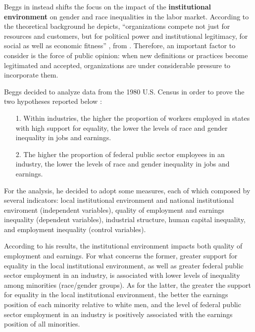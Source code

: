 Beggs in \cite{beggs1995institutional} instead shifts the focus on the impact of the \textbf{institutional environment} on gender and race inequalities in the labor market. According to the theoretical background he depicts, ``organizations compete not just for resources and customers, but for political power and institutional legitimacy, for social as well as economic fitness'' \cite[p.~613]{beggs1995institutional}, from \cite[p.~150]{dimaggio1983iron}. Therefore, an important factor to consider is the force of public opinion: when new definitions or practices become legitimated and accepted, organizations are under considerable pressure to incorporate them.

Beggs decided to analyze data from the 1980 U.S. Census in order to prove the two hypotheses reported below \cite{beggs1995institutional}:
\begin{itemize}
\item[1.] Within industries, the higher the proportion of workers employed in states with high support for equality, the lower the levels of race and gender inequality in jobs and earnings.
\item[2.] The higher the proportion of federal public sector employees in an industry, the lower the levels of race and gender inequality in jobs and earnings.
\end{itemize}

For the analysis, he decided to adopt some measures, each of which composed by several indicators: local institutional environment and national institutional enviroment (independent variables), quality of employment and earnings inequality (dependent variables), industrial structure, human capital inequality, and employment inequality (control variables).

According to his results, the institutional environment impacts both quality of employment and earnings. For what concerns the former, greater support for equality in the local institutional environment, as well as greater federal public sector employment in an industry, is associated with lower levels of inequality among minorities (race/gender groups). As for the latter, the greater the support for equality in the local institutional environment, the better the earnings position of each minority relative to white men, and the level of federal public sector employment in an industry is positively associated with the earnings position of all minorities.


